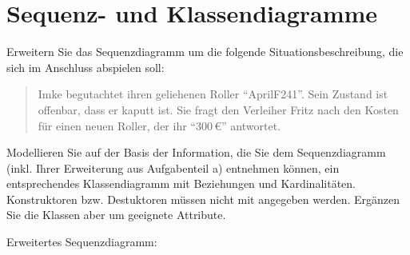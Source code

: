 \documentclass[a4paper]{scrartcl}
\begin{document}
\section*{Sequenz- und Klassendiagramme}

\begin{aufgabe}
    \begin{teilaufgaben}
        \teilaufgabe[5] Erweitern Sie das Sequenzdiagramm um die folgende Situationsbeschreibung, die sich im Anschluss abspielen soll:
            \begin{quotation}
                Imke begutachtet ihren geliehenen Roller \enquote{AprilF241}. Sein Zustand ist offenbar, dass er kaputt ist. Sie fragt den Verleiher Fritz nach den Kosten für einen neuen Roller, der ihr \enquote{300\,\euro} antwortet.
            \end{quotation}
        \teilaufgabe[10] Modellieren Sie auf der Basis der Information, die Sie dem Sequenzdiagramm (inkl. Ihrer Erweiterung aus Aufgabenteil a) entnehmen können, ein entsprechendes Klassendiagramm mit Beziehungen und Kardinalitäten. Konstruktoren bzw. Destuktoren müssen nicht mit angegeben werden. Ergänzen Sie die Klassen aber um geeignete Attribute.
    \end{teilaufgaben}
    \begin{loesung}
        \begin{teilaufgaben}
            \teilaufgabe Erweitertes Sequenzdiagramm:


\end{teilaufgaben}
\end{loesung}
\end{aufgabe}
\end{document}
